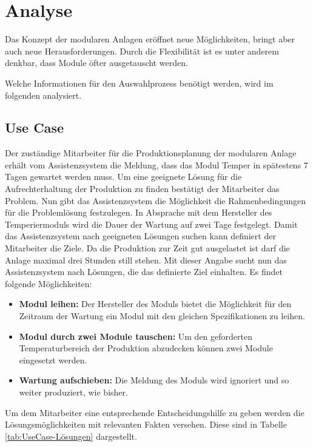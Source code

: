
\chapter{Analyse}
\label{sec:Anforderungsanalyse}
Das Konzept der modularen Anlagen eröffnet neue Möglichkeiten, bringt aber auch neue Herausforderungen. Durch die Flexibilität ist es unter anderem denkbar, dass Module öfter ausgetauscht werden.

Welche Informationen für den Auswahlprozess benötigt werden, wird im folgenden analysiert. 

\section{Use Case}
Der zuständige Mitarbeiter für die Produktionsplanung der modularen Anlage erhält vom Assistenzsystem die Meldung, dass das Modul Temper in spätestens 7 Tagen gewartet werden muss. Um eine geeignete Lösung für die Aufrechterhaltung der Produktion zu finden bestätigt der Mitarbeiter das Problem. Nun gibt das Assistenzsystem die Möglichkeit die Rahmenbedingungen für die Problemlösung festzulegen. In Absprache mit dem Hersteller des Temperiermoduls wird die Dauer der Wartung auf zwei Tage festgelegt. Damit das Assistenzsystem nach geeigneten Lösungen suchen kann definiert der Mitarbeiter die Ziele. Da die Produktion zur Zeit gut ausgelastet ist darf die Anlage maximal drei Stunden still stehen. Mit dieser Angabe sucht nun das Assistenzsystem nach Lösungen, die das definierte Ziel einhalten. Es findet folgende Möglichkeiten:
\begin{itemize}
\item \textbf{Modul leihen:} Der Hersteller des Moduls bietet die Möglichkeit für den Zeitraum der Wartung ein Modul mit den gleichen Spezifikationen zu leihen.
\item \textbf{Modul durch zwei Module tauschen:} Um den geforderten Temperaturbereich der Produktion abzudecken können zwei Module eingesetzt werden.
\item \textbf{Wartung aufschieben:} Die Meldung des Moduls wird ignoriert und so weiter produziert, wie bisher.
\end{itemize}
Um dem Mitarbeiter eine entsprechende Entscheidungshilfe zu geben werden die Lösungsmöglichkeiten mit relevanten Fakten versehen. Diese sind in Tabelle \ref{tab:UseCase-Lösungen} dargestellt.

